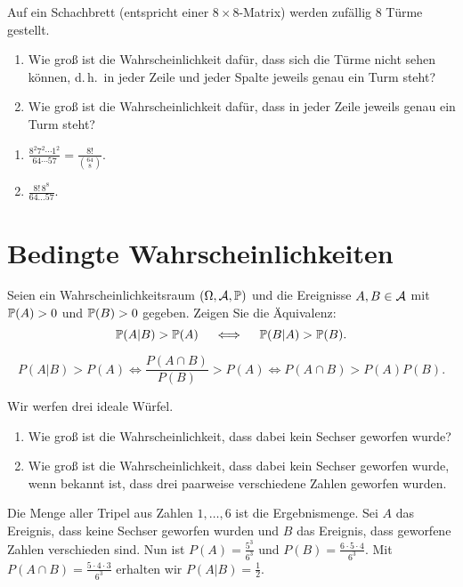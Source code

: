  Auf ein Schachbrett (entspricht einer 
$8\times 8$-Matrix) werden zufällig $8$ Türme gestellt. 
\begin{enumerate}
    \item Wie groß ist die Wahrscheinlichkeit dafür, dass sich die Türme nicht
        sehen können, d.\,h.\ in jeder Zeile und jeder Spalte jeweils genau ein
        Turm steht?
    \item Wie groß ist die Wahrscheinlichkeit dafür, dass in jeder Zeile jeweils
        genau ein Turm steht?
\end{enumerate}

\solution
\begin{enumerate}
    \item $\frac{8^2 7^2 \cdots 1^2}{ 64 \cdots 57} = \frac{8!}{ \binom{64}{8}}$.
    \item $\frac{8!\, 8^8}{64 \dots 57}$.
\end{enumerate}

\section{Bedingte Wahrscheinlichkeiten}


Seien ein Wahrscheinlichkeitsraum $\left( \Omega, \mathcal A, \mathbb P \right)$ und die
Ereignisse $A,B\in \mathcal A$ mit $\mathbb P(A)>0$ und $\mathbb P(B)>0$ gegeben.  Zeigen Sie die
Äquivalenz:
\begin{equation*}
    \mathbb P(A | B ) > \mathbb P(A) \quad \iff \quad \mathbb P(B | A) > \mathbb P(B).
\end{equation*}

\solution
\begin{equation*}
    P(A|B)>P(A) \iff \frac{ P(A \cap B) }{ P(B)} > P(A) \iff P(A \cap B) > P(A)P(B).
\end{equation*}


 Wir werfen drei ideale Würfel. 
\begin{enumerate}
    \item Wie groß ist die Wahrscheinlichkeit, dass dabei kein Sechser geworfen wurde? 
    \item Wie groß ist die Wahrscheinlichkeit, dass dabei kein Sechser geworfen wurde, wenn
        bekannt ist, dass drei paarweise verschiedene Zahlen geworfen wurden. 
\end{enumerate}

\solution Die Menge aller Tripel aus Zahlen $1,\dots,6$ ist die Ergebnismenge.
Sei $A$ das Ereignis, dass keine Sechser geworfen wurden und $B$ das Ereignis,
dass geworfene Zahlen verschieden sind. Nun ist $P(A) = \frac{5^3}{6^3}$ und
$P(B)= \frac{6\cdot 5\cdot 4}{6^{3}}$. Mit $P(A \cap B) = \frac{5\cdot 4\cdot
3}{6^{3}}$ erhalten wir $P(A|B)=\frac{1}{2}$.


